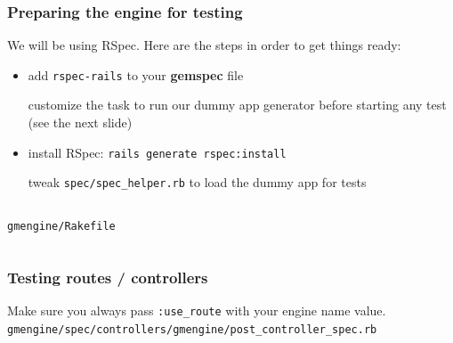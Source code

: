 \documentclass[compress]{beamer}
\begin{document}
\begin{frame}
\frametitle{Preparing the engine for testing}

We will be using RSpec. Here are the steps in order to get things ready:
\begin{itemize}
  \item add \texttt{rspec-rails} to your \textbf{gemspec} file
    \begin{item}
      customize the task to run our dummy app generator before starting any test
      (see the next slide)
    \end{item}
  \item install RSpec: \texttt{rails generate rspec:install}
  \begin{item}
    tweak \texttt{spec/spec\_helper.rb} to load the dummy app for tests
    \inputminted[fontsize=\tiny,gobble=0,linenos=true,firstline=3,lastline=7]{ruby}{code/gmengine/spec/spec_helper.rb}
  \end{item}
\end{itemize}
\end{frame}

\begin{frame}
  \texttt{gmengine/Rakefile}
  \inputminted[fontsize=\tiny,gobble=0,linenos=true,firstline=26,lastline=0]{ruby}{code/gmengine/Rakefile}
\end{frame}

\begin{frame}
\frametitle{Testing routes / controllers}
  Make sure you always pass \texttt{:use\_route} with your engine name value.
  \\
  \small\texttt{gmengine/spec/controllers/gmengine/post\_controller\_spec.rb}
  \inputminted[fontsize=\tiny,gobble=0,linenos=true,firstline=0,lastline=0]{ruby}{code/gmengine/spec/controllers/gmengine/posts_controller_spec.rb}
\end{frame}
\end{document}
